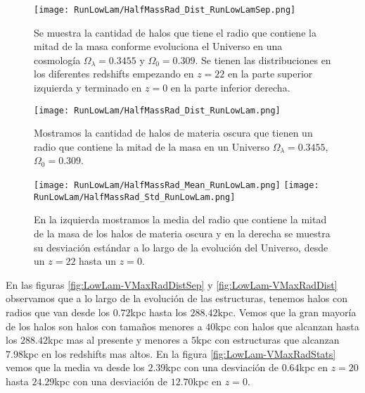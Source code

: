 \begin{figure}[H]
    \centering
    \texttt{[image: RunLowLam/HalfMassRad\_Dist\_RunLowLamSep.png]}
    \caption[Radio que contiene la mitad de la masa]{\footnotesize Se muestra la cantidad de halos que tiene el radio que contiene la mitad de la masa conforme evoluciona el Universo en una cosmología $\Omega_\lambda = 0.3455$ y $\Omega_0 = 0.309$. Se tienen las distribuciones en los diferentes redshifts empezando en $z=22$ en la parte superior izquierda y terminado en $z=0$ en la parte inferior derecha.}
    \label{fig:LowLam-HalfMassRadDistSep}
\end{figure}

\begin{figure}[H]
    \centering
    \texttt{[image: RunLowLam/HalfMassRad\_Dist\_RunLowLam.png]}
    \caption[Distribución del radio que contiene la mitad de la masa]{\footnotesize Mostramos la cantidad de halos de materia oscura que tienen un radio que contiene la mitad de la masa en un Universo $\Omega_\lambda = 0.3455$, $\Omega_0 = 0.309$.}
    \label{fig:LowLam-HalfMassRadDist}
\end{figure}

\begin{figure}[H]
    \centering
    \texttt{[image: RunLowLam/HalfMassRad\_Mean\_RunLowLam.png]}
    \texttt{[image: RunLowLam/HalfMassRad\_Std\_RunLowLam.png]}
    \caption[Media y desviación estándar del radio de la mitad de la masa]{\footnotesize En la izquierda mostramos la media del radio que contiene la mitad de la masa de los halos de materia oscura y en la derecha se muestra su desviación estándar a lo largo de la evolución del Universo, desde un $z=22$ hasta un $z=0$.}
    \label{fig:LowLam-HalfMassRadStats}
\end{figure}

En las figuras \ref{fig:LowLam-VMaxRadDistSep} y \ref{fig:LowLam-VMaxRadDist} observamos que a lo largo de la evolución de las estructuras, tenemos halos con radios que van desde los $0.72$kpc hasta los $288.42$kpc. Vemos que la gran mayoría de los halos son halos con tamaños menores a $40$kpc con halos que alcanzan hasta los $288.42$kpc mas al presente y menores a $5$kpc con estructuras que alcanzan $7.98$kpc en los redshifts mas altos. En la figura \ref{fig:LowLam-VMaxRadStats} vemos que la media va desde los $2.39$kpc con una desviación de $0.64$kpc en $z=20$ hasta $24.29$kpc con una desviación de $12.70$kpc en $z=0$.

